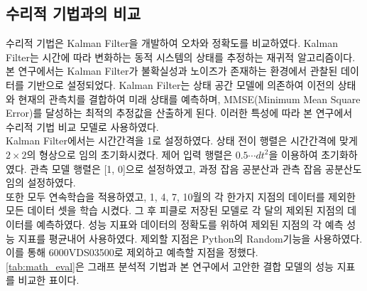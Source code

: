 \documentclass[11pt]{report}
\begin{document}
\subsection{수리적 기법과의 비교}
수리적 기법은 Kalman Filter을 개발하여 오차와 정확도를 비교하였다. 
Kalman Filter는 시간에 따라 변화하는 동적 시스템의 상태를 추정하는 재귀적 알고리즘이다. 
본 연구에서는 Kalman Filter가 불확실성과 노이즈가 존재하는 환경에서 관찰된 데이터를 기반으로 설정되었다. 
Kalman Filter는 상태 공간 모델에 의존하여 이전의 상태와 현재의 관측치를 결합하여 미래 상태를 예측하며, MMSE(Minimum Mean Square Error)를 달성하는 최적의 추정값을 산출하게 된다.
이러한 특성에 따라 본 연구에서 수리적 기법 비교 모델로 사용하였다. \\
\indent Kalman Filter에서는 시간간격을 1로 설정하였다. 상태 전이 행렬은 시간간격에 맞게 $2 \times 2$의 형상으로 임의 초기화시켰다. 
제어 입력 행렬은 $0.5 \cdots dt^2$을 이용하여 초기화하였다. 
관측 모델 행렬은 [1, 0]으로 설정하였고, 
과정 잡음 공분산과 관측 잡음 공분산도 임의 설정하였다. \\
\indent 또한 모두 연속학습을 적용하였고, 1, 4, 7, 10월의 각 한가지 지점의 데이터를 제외한 모든 데이터 셋을 학습 시켰다. 그 후 피클로 저장된 모델로 각 달의 제외된 지점의 데이터를 예측하였다. 
성능 지표와 데이터의 정확도를 위하여 제외된 지점의 각 예측 성능 지표를 평균내어 사용하였다. 제외할 지점은 Python의 Random기능을 사용하였다. 이를 통해 6000VDS03500로 제외하고 예측할 지점을 정했다. \\
\indent \autoref{tab:math_eval}은 그래프 분석적 기법과 본 연구에서 고안한 결합 모델의 성능 지표를 비교한 표이다. 
\end{document}
